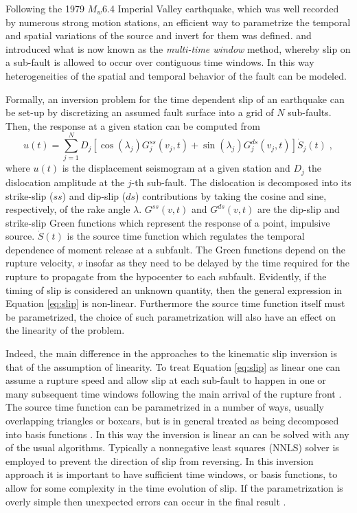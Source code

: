 Following the 1979 $M_w$6.4 Imperial Valley earthquake, which was well recorded by numerous strong motion stations, an efficient way to parametrize the temporal and spatial variations of the source and invert for them was defined. \citet{olson1982} and \citet{hartzell1983} introduced what is now known as the \textit{multi-time window} method, whereby slip on a sub-fault is allowed to occur over contiguous time windows. In this way heterogeneities of the spatial and temporal behavior of the fault can be modeled.

Formally, an inversion problem for the time dependent slip of an earthquake can be set-up by discretizing an assumed fault surface into a grid of $N$ sub-faults. Then, the response at a given station can be computed from
\begin{equation}
\label{eq:slip}
u(t)=\sum_{j=1}^ND_j[\cos(\lambda_j)G_j^{ss}(v_j,t)+\sin(\lambda_j)G_j^{ds}(v_j,t)]\dot{S}_j(t)\;,
\end{equation}
where $u(t)$ is the displacement seismogram at a given station and $D_j$ the dislocation amplitude at the $j$-th sub-fault. The dislocation is decomposed into its strike-slip ($ss$) and dip-slip ($ds$) contributions by taking the cosine and sine, respectively, of the rake angle $\lambda$. $G^{ss}(v,t)$ and $G^{ds}(v,t)$ are the dip-slip and strike-slip Green functions which represent the response of a point, impulsive source. $\dot{S}(t)$ is the source time function which regulates the temporal dependence of moment release at a subfault. The Green functions depend on the rupture velocity, $v$ insofar as they need to be delayed by the time required for the rupture to propagate from the hypocenter to each subfault. Evidently, if the timing of slip is considered an unknown quantity, then the general expression in Equation \ref{eq:slip} is non-linear. Furthermore the source time function itself must be parametrized, the choice of such parametrization will also have an effect on the linearity of the problem.

Indeed, the main difference in the approaches to the kinematic slip inversion is that of the assumption of linearity. To treat Equation \ref{eq:slip} as linear one can assume a rupture speed  and allow slip at each sub-fault to happen in one or many subsequent time windows following the main arrival of the rupture front \citep{olson1982,hartzell1983}. The source time function can be parametrized in a number of ways, usually overlapping triangles or boxcars, but is in general treated as being decomposed into basis functions \citep{ide1996}. In this way the inversion is linear an can be solved with any of the usual algorithms. Typically a nonnegative least squares (NNLS) solver is employed \citep{lawson1974} to prevent the direction of slip from reversing. In this inversion approach it is important to have sufficient time windows, or basis functions, to allow for some complexity in the time evolution of slip. If the parametrization is overly simple then unexpected errors can occur in the final result \citep{hartzell1993}.

